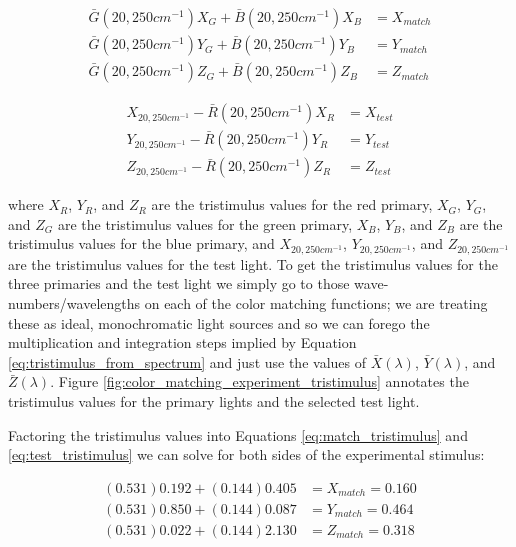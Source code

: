 \documentclass{article}
\begin{document}
\begin{multicols}{2}
\begin{equation}\label{eq:match_tristimulus} %
    \begin{aligned}
        \bar{G}(20,250cm^{-1})X_G+\bar{B}(20,250cm^{-1})X_B&=X_{match}\\
        \bar{G}(20,250cm^{-1})Y_G+\bar{B}(20,250cm^{-1})Y_B&=Y_{match}\\
        \bar{G}(20,250cm^{-1})Z_G+\bar{B}(20,250cm^{-1})Z_B&=Z_{match}
    \end{aligned}
\end{equation}

\begin{equation}\label{eq:test_tristimulus} %
    \begin{aligned}
        X_{20,250cm^{-1}}-\bar{R}(20,250cm^{-1})X_R&=X_{test}\\
        Y_{20,250cm^{-1}}-\bar{R}(20,250cm^{-1})Y_R&=Y_{test}\\
        Z_{20,250cm^{-1}}-\bar{R}(20,250cm^{-1})Z_R&=Z_{test}
    \end{aligned}
\end{equation}

where $X_R$, $Y_R$, and $Z_R$ are the tristimulus values for the red primary, $X_G$, $Y_G$, and $Z_G$ are the tristimulus values for the green primary, $X_B$, $Y_B$, and $Z_B$ are the tristimulus values for the blue primary, and $X_{20,250cm^{-1}}$, $Y_{20,250cm^{-1}}$, and $Z_{20,250cm^{-1}}$ are the tristimulus values for the test light.  To get the tristimulus values for the three primaries and the test light we simply go to those wave-numbers/wavelengths on each of the color matching functions; we are treating these as ideal, monochromatic light sources and so we can forego the multiplication and integration steps implied by Equation \ref{eq:tristimulus_from_spectrum} and just use the values of $\bar{X}(\lambda)$, $\bar{Y}(\lambda)$, and $\bar{Z}(\lambda)$.  Figure \ref{fig:color_matching_experiment_tristimulus} annotates the tristimulus values for the primary lights and the selected test light.

Factoring the tristimulus values into Equations \ref{eq:match_tristimulus} and \ref{eq:test_tristimulus} we can solve for both sides of the experimental stimulus:

\begin{equation} %
    \begin{aligned}
        (0.531)0.192+(0.144)0.405&=X_{match}=0.160\\
        (0.531)0.850+(0.144)0.087&=Y_{match}=0.464\\
        (0.531)0.022+(0.144)2.130&=Z_{match}=0.318
    \end{aligned}
\end{equation}


\end{multicols}
\end{document}
